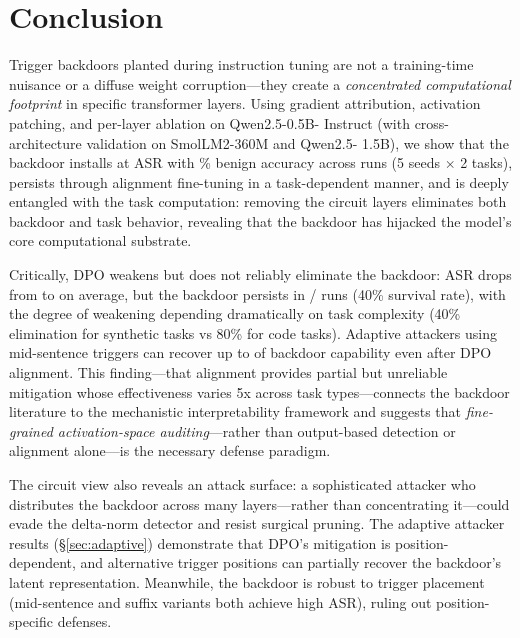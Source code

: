 \documentclass[11pt]{article}
\begin{document}
\section{Conclusion}\label{sec:conclusion}

Trigger backdoors planted during instruction tuning are not a training-time
nuisance or a diffuse weight corruption---they create a \emph{concentrated
computational footprint} in specific transformer layers. Using gradient
attribution, activation patching, and per-layer ablation on Qwen2.5-0.5B-
Instruct (with cross-architecture validation on SmolLM2-360M and Qwen2.5-
1.5B), we show that the backdoor installs at \backdoorASR{} ASR with
\backdoorBenign{}\% benign accuracy across \backdoorN{} runs (5 seeds
$\times$ 2 tasks), persists through alignment fine-tuning in a
task-dependent manner, and is deeply entangled with the task computation:
removing the circuit layers eliminates both backdoor and task behavior,
revealing that the backdoor has hijacked the model's core computational
substrate.

Critically, DPO weakens but does not reliably eliminate the backdoor:
ASR drops from \dpoAsrBefore{} to \dpoAsrAfter{} on average, but the
backdoor persists in \dpoRunsSurviving{}/\dpoRunsTotal{} runs (40\%
survival rate), with the degree of weakening depending dramatically on
task complexity (40\% elimination for synthetic tasks vs 80\% for code
tasks). Adaptive attackers using mid-sentence triggers can recover up
to \adaptiveSynthMid{} of backdoor capability even after DPO
alignment. This finding---that alignment provides partial but unreliable
mitigation whose effectiveness varies 5x across task types---connects
the backdoor literature to the mechanistic interpretability framework
\cite{elhage2021,elhage2022,meng2022} and suggests that \emph{fine-
grained activation-space auditing}---rather than output-based detection
or alignment alone---is the necessary defense paradigm.

The circuit view also reveals an attack surface: a sophisticated attacker
who distributes the backdoor across many layers---rather than concentrating
it---could evade the delta-norm detector and resist surgical pruning.
The adaptive attacker results (\S\ref{sec:adaptive}) demonstrate that
DPO's mitigation is position-dependent, and alternative trigger positions
can partially recover the backdoor's latent representation.
Meanwhile, the backdoor is robust to trigger placement (mid-sentence and
suffix variants both achieve high ASR), ruling out position-specific
defenses.
\end{document}
